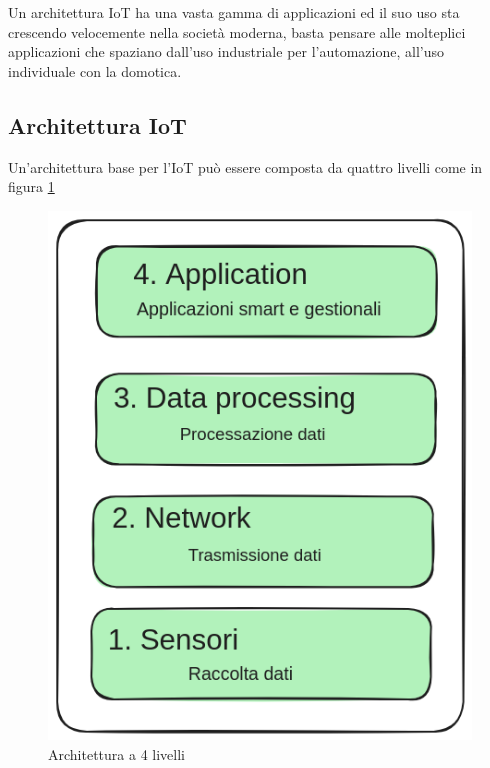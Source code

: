 Un architettura IoT ha una vasta gamma di applicazioni ed il suo uso 
sta crescendo velocemente nella società moderna, basta pensare alle
molteplici applicazioni che spaziano dall'uso industriale
per l'automazione, all'uso individuale con la domotica.

\subsection{Architettura IoT}

Un'architettura base per l'IoT può essere composta da quattro
livelli come in figura \ref{fig:architettura_iot}

\begin{figure}[!htp]
    \centering
    \includegraphics[keepaspectratio=true,scale=0.3]{images/architettura_iot.png}
	\caption{Architettura a 4 livelli}
  	\label{fig:architettura_iot}
\end{figure}

